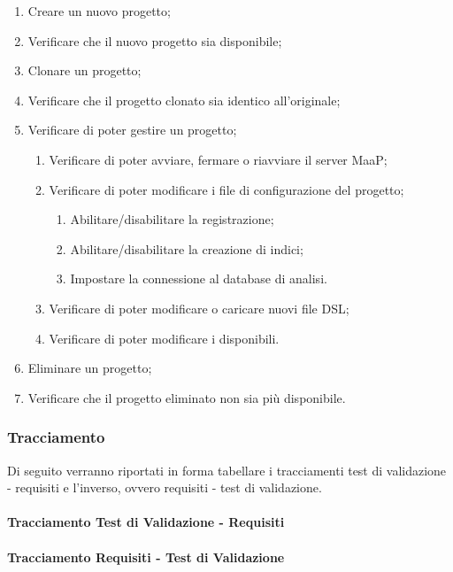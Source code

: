 \begin{enumerate}
\item Creare un nuovo progetto;
\item Verificare che il nuovo progetto sia disponibile;
\item Clonare un progetto;
\item Verificare che il progetto clonato sia identico all'originale;
\item Verificare di poter gestire un progetto;
\begin{enumerate}
\item Verificare di poter avviare, fermare o riavviare il server MaaP;
\item Verificare di poter modificare i file di configurazione del progetto;
\begin{enumerate}
\item Abilitare/disabilitare la registrazione;
\item Abilitare/disabilitare la creazione di indici;
\item Impostare la connessione al database di analisi.
\end{enumerate}
\item Verificare di poter modificare o caricare nuovi file DSL;
\item Verificare di poter modificare i  disponibili.
\end{enumerate}
\item Eliminare un progetto;
\item Verificare che il progetto eliminato non sia più disponibile.
\end{enumerate}

\subsubsection{Tracciamento}
Di seguito verranno riportati in forma tabellare i tracciamenti test di validazione - requisiti e l'inverso, ovvero requisiti - test di validazione.\\

\paragraph{Tracciamento Test di Validazione - Requisiti}


\paragraph{Tracciamento Requisiti - Test di Validazione}
